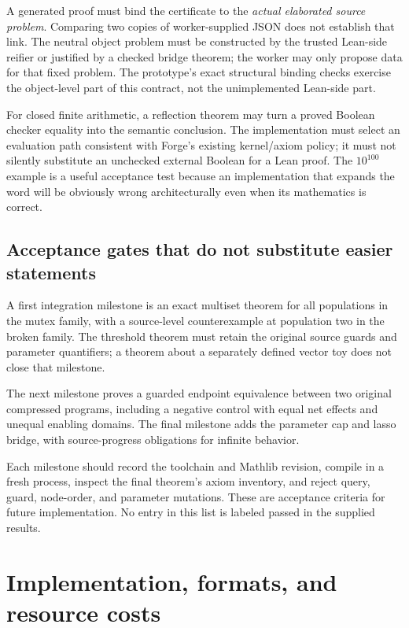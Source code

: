 \documentclass[11pt,a4paper]{article}
\theoremstyle{definition}
\theoremstyle{remark}
\begin{document}
A generated proof must bind the certificate to the \emph{actual elaborated source problem}. Comparing two copies of worker-supplied JSON does not establish that link. The neutral object problem must be constructed by the trusted Lean-side reifier or justified by a checked bridge theorem; the worker may only propose data for that fixed problem. The prototype's exact structural binding checks exercise the object-level part of this contract, not the unimplemented Lean-side part.

For closed finite arithmetic, a reflection theorem may turn a proved Boolean checker equality into the semantic conclusion. The implementation must select an evaluation path consistent with Forge's existing kernel/axiom policy; it must not silently substitute an unchecked external Boolean for a Lean proof. The $10^{100}$ example is a useful acceptance test because an implementation that expands the word will be obviously wrong architecturally even when its mathematics is correct.

\subsection{Acceptance gates that do not substitute easier statements}
A first integration milestone is an exact multiset theorem for all populations in the mutex family, with a source-level counterexample at population two in the broken family. The threshold theorem must retain the original source guards and parameter quantifiers; a theorem about a separately defined vector toy does not close that milestone.

The next milestone proves a guarded endpoint equivalence between two original compressed programs, including a negative control with equal net effects and unequal enabling domains. The final milestone adds the parameter cap and lasso bridge, with source-progress obligations for infinite behavior.

Each milestone should record the toolchain and Mathlib revision, compile in a fresh process, inspect the final theorem's axiom inventory, and reject query, guard, node-order, and parameter mutations. These are acceptance criteria for future implementation. No entry in this list is labeled passed in the supplied results.

\section{Implementation, formats, and resource costs}\label{sec:implementation}
\end{document}
